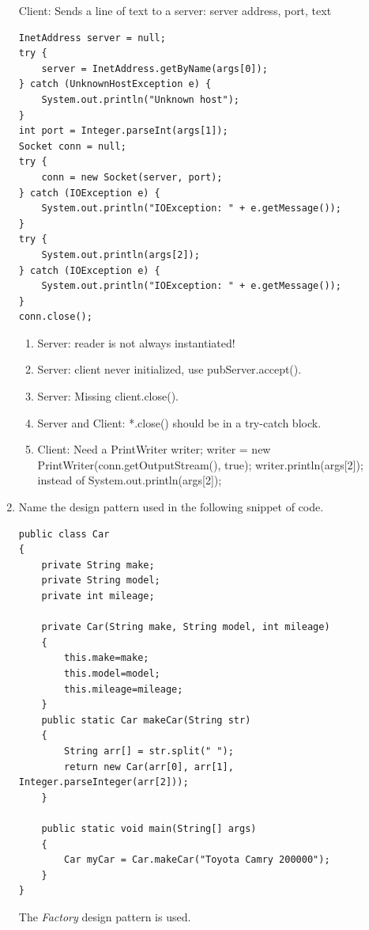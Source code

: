 \documentclass[11pt]{article}
\newenvironment{answer}{\large\lstset{basicstyle=\tiny\ttfamily}\color{white}}{}
\newenvironment{answer}{\large\lstset{basicstyle=\large\ttfamily}\color{red}}{}
\begin{document}
\begin{enumerate}
	Client: Sends a line of text to a server: server address, port, text
	\begin{lstlisting}
InetAddress server = null;
try {
	server = InetAddress.getByName(args[0]);
} catch (UnknownHostException e) {
	System.out.println("Unknown host");
}
int port = Integer.parseInt(args[1]);
Socket conn = null;
try {
	conn = new Socket(server, port);
} catch (IOException e) {
	System.out.println("IOException: " + e.getMessage());
}
try {
	System.out.println(args[2]);
} catch (IOException e) {
	System.out.println("IOException: " + e.getMessage());
}
conn.close();
	\end{lstlisting}
	\begin{answer}
		\begin{enumerate}
		\item
			Server: reader is not always instantiated!
		\item
			Server: client never initialized, use pubServer.accept().
		\item
			Server: Missing client.close().
		\item
			Server and Client: *.close() should be in a try-catch block.
		\item
			Client: Need a PrintWriter writer; writer = new PrintWriter(conn.getOutputStream(), true); writer.println(args[2]); instead of System.out.println(args[2]);
		\end{enumerate}
	\end{answer}

\newpage
\item Name the design pattern used in the following snippet of code.
\begin{lstlisting}
public class Car
{
	private String make;
	private String model;
	private int mileage;

	private Car(String make, String model, int mileage)
	{
		this.make=make;
		this.model=model;
		this.mileage=mileage;
	}
	public static Car makeCar(String str)
	{
		String arr[] = str.split(" ");
		return new Car(arr[0], arr[1], Integer.parseInteger(arr[2]));
	}

	public static void main(String[] args)
	{
		Car myCar = Car.makeCar("Toyota Camry 200000");
	}
}
\end{lstlisting}

\begin{answer}
The \emph{Factory} design pattern is used.
\vspace{.5in}
\end{answer}
\end{enumerate}
\end{document}

